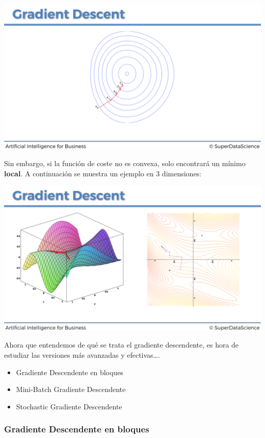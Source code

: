 \documentclass[
]{book}
\providecommand{\tightlist}{%
  \setlength{\itemsep}{0pt}\setlength{\parskip}{0pt}}
\begin{document}
\includegraphics{Images/ANN_24.png}

Sin embargo, si la función de coste no es convexa, solo encontrará un mínimo \textbf{local}. A continuación se muestra un ejemplo en 3 dimensiones:

\includegraphics{Images/ANN_25.png}

Ahora que entendemos de qué se trata el gradiente descendente, es hora de estudiar las versiones más avanzadas y efectivas\ldots.

\begin{itemize}
\tightlist
\item
  Gradiente Descendente en bloques
\item
  Mini-Batch Gradiente Descendente
\item
  Stochastic Gradiente Descendente
\end{itemize}

\hypertarget{gradiente-descendente-en-bloques}{%
\subsubsection{Gradiente Descendente en bloques}\label{gradiente-descendente-en-bloques}}
\end{document}
